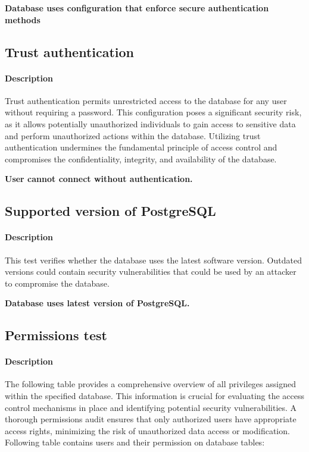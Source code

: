 \textbf{Database uses configuration that enforce secure authentication methods}



\subsection{Trust authentication}
\paragraph{Description} Trust authentication permits unrestricted access to the database for any user without requiring a password. This configuration poses a significant security risk, as it allows potentially unauthorized individuals to gain access to sensitive data and perform unauthorized actions within the database. Utilizing trust authentication undermines the fundamental principle of access control and compromises the confidentiality, integrity, and availability of the database.

\textbf{User cannot connect without authentication.}



\subsection{Supported version of PostgreSQL}
\paragraph{Description} This test verifies whether the database uses the latest software version. Outdated versions could contain security vulnerabilities that could be used by an attacker to compromise the database.

\textbf{Database uses latest version of PostgreSQL.}



\subsection{Permissions test}
\paragraph{Description} The following table provides a comprehensive overview of all privileges assigned within the specified database. This information is crucial for evaluating the access control mechanisms in place and identifying potential security vulnerabilities. A thorough permissions audit ensures that only authorized users have appropriate access rights, minimizing the risk of unauthorized data access or modification. Following table contains users and their permission on database tables:


